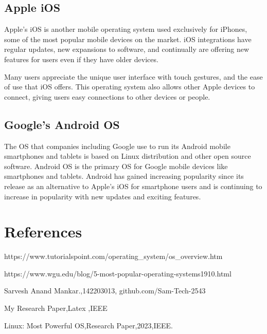 \documentclass[12pt]{article}
\begin{document}
\subsection{Apple iOS}
Apple's iOS is another mobile operating system used exclusively for iPhones, some of the most popular mobile devices on the market. iOS integrations have regular updates, new expansions to software, and continually are offering new features for users even if they have older devices. 

Many users appreciate the unique user interface with touch gestures, and the ease of use that iOS offers. This operating system also allows other Apple devices to connect, giving users easy connections to other devices or people.

\subsection{Google's Android OS}
The OS that companies including Google use to run its Android mobile smartphones and tablets is based on Linux distribution and other open source software. Android OS is the primary OS for Google mobile devices like smartphones and tablets. Android has gained increasing popularity since its release as an alternative to Apple’s iOS for smartphone users and is continuing to increase in popularity with new updates and exciting features.

\clearpage

\section{References}
\begin{thebibliography} {}

https://www.tutorialspoint.com/operating\_system/os\_overview.htm

 https://www.wgu.edu/blog/5-most-popular-operating-systems1910.html

 Sarvesh Anand Mankar.,142203013, github.com/Sam-Tech-2543

 My Research Paper,Latex ,IEEE

 Linux: Most Powerful OS,Research Paper,2023,IEEE.

\end{thebibliography} 

\printbibliography 
\end{document}
